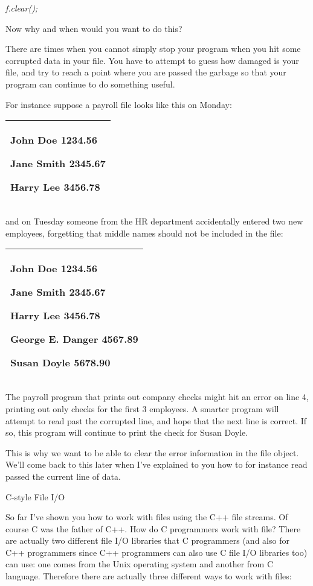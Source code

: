 \documentclass[
]{article}
\begin{document}
\emph{f.clear();}

Now why and when would you want to do this?

There are times when you cannot simply stop your program when you hit
some corrupted data in your file. You have to attempt to guess how
damaged is your file, and try to reach a point where you are passed the
garbage so that your program can continue to do something useful.

For instance suppose a payroll file looks like this on Monday:

\begin{longtable}[]{@{}l@{}}
\toprule
\endhead
\begin{minipage}[t]{0.97\columnwidth}\raggedright
John Doe 1234.56

Jane Smith 2345.67

Harry Lee 3456.78\strut
\end{minipage}\tabularnewline
\bottomrule
\end{longtable}

and on Tuesday someone from the HR department accidentally entered two
new employees, forgetting that middle names should not be included in
the file:

\begin{longtable}[]{@{}l@{}}
\toprule
\endhead
\begin{minipage}[t]{0.97\columnwidth}\raggedright
John Doe 1234.56

Jane Smith 2345.67

Harry Lee 3456.78

George E. Danger 4567.89

Susan Doyle 5678.90\strut
\end{minipage}\tabularnewline
\bottomrule
\end{longtable}

The payroll program that prints out company checks might hit an error on
line 4, printing out only checks for the first 3 employees. A smarter
program will attempt to read past the corrupted line, and hope that the
next line is correct. If so, this program will continue to print the
check for Susan Doyle.

This is why we want to be able to clear the error information in the
file object. We'll come back to this later when I've explained to you
how to for instance read passed the current line of data.

C-style File I/O

So far I've shown you how to work with files using the C++ file streams.
Of course C was the father of C++. How do C programmers work with file?
There are actually two different file I/O libraries that C programmers
(and also for C++ programmers since C++ programmers can also use C file
I/O libraries too) can use: one comes from the Unix operating system and
another from C language. Therefore there are actually three different
ways to work with files:
\end{document}
